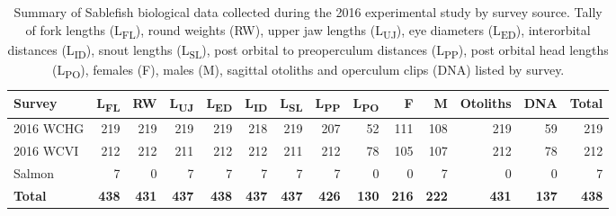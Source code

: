 \documentclass[12pt]{article}\usepackage[]{graphicx}\usepackage[]{color}
\begin{document}
\begin{table}[!h]

\caption{\label{tab:table2}Summary of Sablefish biological data collected during the 2016 experimental study by survey source. Tally of fork lengths (L\textsubscript{FL}), round weights (RW), upper jaw lengths (L\textsubscript{UJ}), eye diameters (L\textsubscript{ED}), interorbital distances (L\textsubscript{ID}), snout lengths (L\textsubscript{SL}), post orbital to preoperculum distances (L\textsubscript{PP}), post orbital head lengths (L\textsubscript{PO}), females (F), males (M), sagittal otoliths and operculum clips (DNA) listed by survey.}
\fontsize{10}{12}\selectfont
\begin{tabular}[t]{lrrrrrrrrrrrrr}
\toprule
\textbf{Survey} & \textbf{L\textsubscript{FL}} & \textbf{RW} & \textbf{L\textsubscript{UJ}} & \textbf{L\textsubscript{ED}} & \textbf{L\textsubscript{ID}} & \textbf{L\textsubscript{SL}} & \textbf{L\textsubscript{PP}} & \textbf{L\textsubscript{PO}} & \textbf{F} & \textbf{M} & \textbf{Otoliths} & \textbf{DNA} & \textbf{Total}\\
\midrule
2016 WCHG & 219 & 219 & 219 & 219 & 218 & 219 & 207 & 52 & 111 & 108 & 219 & 59 & 219\\
2016 WCVI & 212 & 212 & 211 & 212 & 212 & 211 & 212 & 78 & 105 & 107 & 212 & 78 & 212\\
Salmon & 7 & 0 & 7 & 7 & 7 & 7 & 7 & 0 & 0 & 7 & 0 & 0 & 7\\
\midrule
\textbf{Total} & \textbf{438} & \textbf{431} & \textbf{437} & \textbf{438} & \textbf{437} & \textbf{437} & \textbf{426} & \textbf{130} & \textbf{216} & \textbf{222} & \textbf{431} & \textbf{137} & \textbf{438}\\
\bottomrule
\end{tabular}
\end{table}
\end{document}
